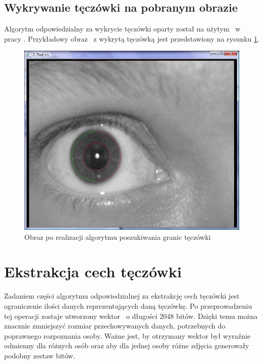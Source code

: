 \subsection{Wykrywanie tęczówki na pobranym obrazie}
\label{subsec:wykrycieTeczowki}
Algorytm odpowiedzialny za wykrycie tęczówki oparty został na użytym ~w pracy \cite{Gl11}. Przykładowy obraz ~z wykrytą tęczówką jest przedstawiony na rysunku \ref{fig:teczowkaNasza}.
\begin{figure}
\begin{center}
\includegraphics[scale=0.5]{teczowka.jpg}
\caption{Obraz po realizacji algorytmu poszukiwania granic tęczówki}
\label{fig:teczowkaNasza}
\end{center}
\end{figure}

\section{Ekstrakcja cech tęczówki}
\label{sec:ekstrakcja}

Zadaniem części algorytmu odpowiedzialnej za ekstrakcję cech tęczówki jest ograniczenie ilości danych reprezentujących daną tęczówkę. Po przeprowadzeniu tej operacji zostaje utworzony wektor ~o długości 2048 bitów. Dzięki temu można znacznie zmniejszyć rozmiar przechowywanych danych, potrzebnych do poprawnego rozpoznania osoby. Ważne jest, by otrzymany wektor był wyraźnie odmienny dla różnych osób oraz aby dla jednej osoby różne zdjęcia generowały podobny zestaw bitów. 

